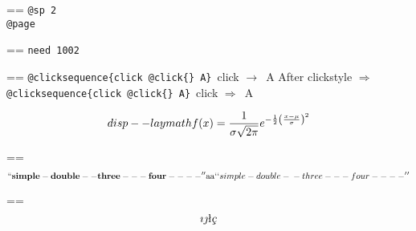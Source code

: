 \documentclass{book}
\makeatletter
\newenvironment{Texinfopreformatted}{%
  \par\GNUTobeylines\obeyspaces\frenchspacing\parskip=\z@\parindent=\z@}{}
{\catcode`\^^M=13 \gdef\GNUTobeylines{\catcode`\^^M=13 \def^^M{\null\par}}}
\newenvironment{Texinfoindented}{\begin{list}{}{}\item\relax}{\end{list}}
\renewcommand{\_}{\Texinfounderscore\discretionary{}{}{}}
\makeatother
\begin{document}
\begin{Texinfoindented}
\begin{Texinfopreformatted}
\texttt{@sp 2}\leavevmode{}\\
\baselineskip %
\texttt{@page}\leavevmode{}\\
\end{Texinfopreformatted}
\newpage{}%
\phantom{blabla}%
\begin{Texinfopreformatted}%
\ttfamily 
\texttt{need 1002}
\end{Texinfopreformatted}
\needspace{1.002pt}%
\begin{Texinfopreformatted}%
\ttfamily 
\texttt{@clicksequence\{click @click\{\}\ A\}}\ click $\rightarrow{}$\ A
After clickstyle $\Rightarrow{}$
\texttt{@clicksequence\{click @click\{\}\ A\}}\ click $\Rightarrow{}$\ A


\end{Texinfopreformatted}
\[
disp--laymath
f(x) = {1 \over \sigma \sqrt{2\pi}}e^{-{1 \over 2}\left({x-\mu \over \sigma}\right)^2}
\]
\begin{Texinfopreformatted}%
\ttfamily 
\end{Texinfopreformatted}
\[
\mathbf{``simple-double--three---four----''} \hbox{aa}
`\hbox{}`simple-double-\hbox{}-three---four----'\hbox{}'
\]
\begin{Texinfopreformatted}%
\ttfamily 
\end{Texinfopreformatted}
\[
\imath{} \jmath{}
\mathord{\text{\l{}}} \textsl{\c{c}}

\]
\end{Texinfoindented}
\end{document}
